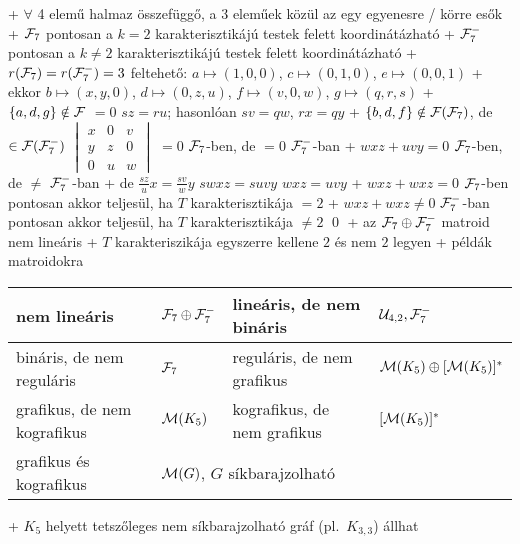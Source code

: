   + $\forall$ 4 elemű halmaz összefüggő, a 3 eleműek közül az egy
    egyenesre / körre esők
  + $\mathcal{F}_7$ pontosan a $k = 2$ karakterisztikájú testek felett
    koordinátázható
  + $\mathcal{F}_7^-$ pontosan a $k \ne 2$ karakterisztikájú
    testek felett koordinátázható
  + \proof $r(\mathcal{F}_7) = r(\mathcal{F}_7^-) = 3$ \RA feltehető: $a
    \mapsto (1, 0, 0)$, $c \mapsto (0, 1, 0)$, $e \mapsto (0, 0, 1)$
    + ekkor $b \mapsto (x, y, 0)$, $d \mapsto (0, z, u)$, $f \mapsto
      (v, 0, w)$, $g \mapsto (q, r, s)$
    + $\{ a, d, g \} \notin \mathcal{F}$  $= 0$ \RA $sz = ru$; hasonlóan $sv = qw$, $rx =
    qy$
    + $\{ b, d, f \} \notin \mathcal{F}(\mathcal{F}_7)$, de $\in \mathcal{F}(\mathcal{F}_7^-)$ \RA%
      {\footnotesize$\begin{vmatrix}
        x & 0 & v \\
        y & z & 0 \\
        0 & u & w
      \end{vmatrix}$} $= 0$ $\mathcal{F}_7$-ben, de $= 0$ $\mathcal{F}_7^-$-ban
      + $wxz + uvy = 0$ $\mathcal{F}_7$-ben, de $\ne$ $\mathcal{F}_7^-$-ban
      + de $\frac{sz}{u} x = \frac{sv}{w} y$ \RA $swxz = suvy$ \RA%
        $wxz = uvy$
      + $wxz + wxz = 0$ $\mathcal{F}_7$-ben pontosan akkor teljesül, ha $T$
        karakterisztikája $= 2$
      + $wxz + wxz \ne 0$ $\mathcal{F}_7^-$-ban pontosan akkor teljesül, ha $T$
        karakterisztikája $\ne 2$ \qed
  + \corr az $\mathcal{F}_7 \oplus \mathcal{F}_7^-$ matroid nem lineáris
    + $T$ karakteriszikája egyszerre kellene $2$ és nem $2$ legyen
+ \example példák matroidokra
  \par
  {\centering\begin{tabular}{>{\footnotesize}l|l||>{\footnotesize}l|l}
    nem lineáris & $\mathcal{F}_7 \oplus \mathcal{F}_7^-$ &
    lineáris, de nem bináris & $\mathcal{U}_{4, 2}, \mathcal{F}_7^-$ \\\hline
    bináris, de nem reguláris & $\mathcal{F}_7$ &
    reguláris, de nem grafikus & $\mathcal{M}(K_5) \oplus [\mathcal{M}(K_5)]^*$ \\\hline
    grafikus, de nem kografikus & $\mathcal{M}(K_5)$ &
    kografikus, de nem grafikus & $[\mathcal{M}(K_5)]^*$ \\\hline
    grafikus és kografikus & \multicolumn{3}{l}{$\mathcal{M}(G)$, $G$ síkbarajzolható}
  \end{tabular}\par}
  + $K_5$ helyett tetszőleges nem síkbarajzolható gráf (pl.~$K_{3,3}$) állhat
